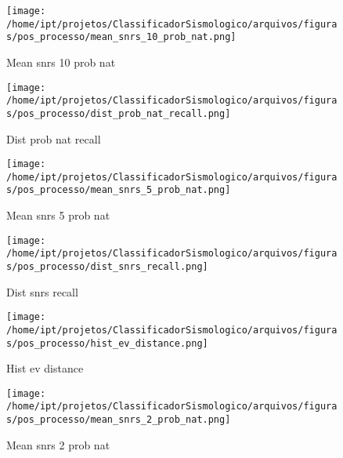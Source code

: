                     \begin{figure}[H]
                        \centering
                        \texttt{[image: /home/ipt/projetos/ClassificadorSismologico/arquivos/figuras/pos\_processo/mean\_snrs\_10\_prob\_nat.png]}
                        \caption{Mean snrs 10 prob nat}
                        \label{fig:mean_snrs_10_prob_nat}
                    \end{figure}
                

                    \begin{figure}[H]
                        \centering
                        \texttt{[image: /home/ipt/projetos/ClassificadorSismologico/arquivos/figuras/pos\_processo/dist\_prob\_nat\_recall.png]}
                        \caption{Dist prob nat recall}
                        \label{fig:dist_prob_nat_recall}
                    \end{figure}
                

                    \begin{figure}[H]
                        \centering
                        \texttt{[image: /home/ipt/projetos/ClassificadorSismologico/arquivos/figuras/pos\_processo/mean\_snrs\_5\_prob\_nat.png]}
                        \caption{Mean snrs 5 prob nat}
                        \label{fig:mean_snrs_5_prob_nat}
                    \end{figure}
                

                    \begin{figure}[H]
                        \centering
                        \texttt{[image: /home/ipt/projetos/ClassificadorSismologico/arquivos/figuras/pos\_processo/dist\_snrs\_recall.png]}
                        \caption{Dist snrs recall}
                        \label{fig:dist_snrs_recall}
                    \end{figure}
                

                    \begin{figure}[H]
                        \centering
                        \texttt{[image: /home/ipt/projetos/ClassificadorSismologico/arquivos/figuras/pos\_processo/hist\_ev\_distance.png]}
                        \caption{Hist ev distance}
                        \label{fig:hist_ev_distance}
                    \end{figure}
                

                    \begin{figure}[H]
                        \centering
                        \texttt{[image: /home/ipt/projetos/ClassificadorSismologico/arquivos/figuras/pos\_processo/mean\_snrs\_2\_prob\_nat.png]}
                        \caption{Mean snrs 2 prob nat}
                        \label{fig:mean_snrs_2_prob_nat}
                    \end{figure}
                

